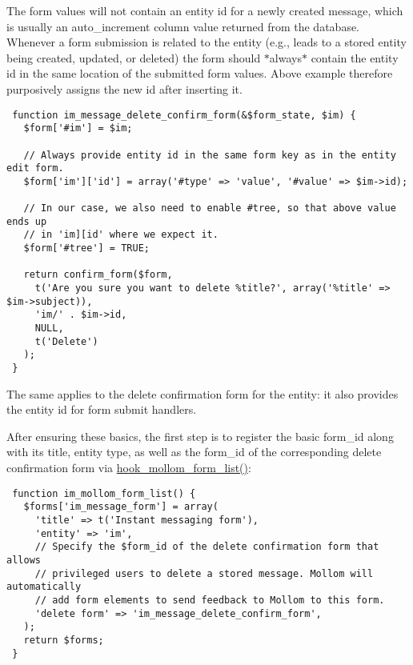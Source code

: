 The form values will not contain an entity id for a newly created message, which is usually an auto\_\-increment column value returned from the database. Whenever a form submission is related to the entity (e.g., leads to a stored entity being created, updated, or deleted) the form should $\ast$always$\ast$ contain the entity id in the same location of the submitted form values. Above example therefore purposively assigns the new id after inserting it.



\begin{Code}\begin{verbatim} function im_message_delete_confirm_form(&$form_state, $im) {
   $form['#im'] = $im;

   // Always provide entity id in the same form key as in the entity edit form.
   $form['im']['id'] = array('#type' => 'value', '#value' => $im->id);

   // In our case, we also need to enable #tree, so that above value ends up
   // in 'im][id' where we expect it.
   $form['#tree'] = TRUE;

   return confirm_form($form,
     t('Are you sure you want to delete %title?', array('%title' => $im->subject)),
     'im/' . $im->id,
     NULL,
     t('Delete')
   );
 }
\end{verbatim}
\end{Code}



The same applies to the delete confirmation form for the entity: it also provides the entity id for form submit handlers.

After ensuring these basics, the first step is to register the basic form\_\-id along with its title, entity type, as well as the form\_\-id of the corresponding delete confirmation form via \hyperlink{group__mollom__api_gdd309b0309f638d79b17a686ea96f564}{hook\_\-mollom\_\-form\_\-list()}:



\begin{Code}\begin{verbatim} function im_mollom_form_list() {
   $forms['im_message_form'] = array(
     'title' => t('Instant messaging form'),
     'entity' => 'im',
     // Specify the $form_id of the delete confirmation form that allows
     // privileged users to delete a stored message. Mollom will automatically
     // add form elements to send feedback to Mollom to this form.
     'delete form' => 'im_message_delete_confirm_form',
   );
   return $forms;
 }
\end{verbatim}
\end{Code}



